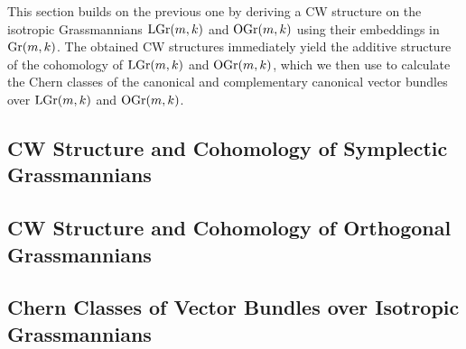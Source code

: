 
This section builds on the previous one by deriving a CW structure on the isotropic Grassmannians $\mathrm{LGr}(m, k)$ and $\mathrm{OGr}(m, k)$ using their embeddings in $\mathrm{Gr}(m, k)$. The obtained CW structures immediately yield the additive structure of the cohomology of $\mathrm{LGr}(m, k)$ and $\mathrm{OGr}(m, k)$, which we then use to calculate the Chern classes of the canonical and complementary canonical vector bundles over $\mathrm{LGr}(m, k)$ and $\mathrm{OGr}(m, k)$. 

\subsection{CW Structure and Cohomology of Symplectic Grassmannians}


\subsection{CW Structure and Cohomology of Orthogonal Grassmannians}


\subsection{Chern Classes of Vector Bundles over Isotropic Grassmannians}

